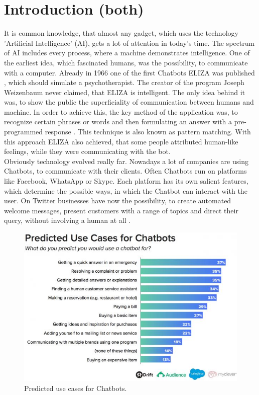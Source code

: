 \documentclass[10pt,final,journal,a4paper,oneside,twocolumn]{IEEEtran}
\begin{document}
\section{Introduction (both)}
It is common knowledge, that almost any gadget, which uses the technology 'Artificial Intelligence' (AI), gets a lot of attention in today's time. The spectrum of AI includes every process, where a machine demonstrates intelligence. One of the earliest idea, which fascinated humans, was the possibility, to communicate with a computer. Already in 1966 one of the first Chatbots ELIZA was published \cite{b1}, which should simulate a psychotherapist. The creator of the program Joseph Weizenbaum never claimed, that ELIZA is intelligent. The only idea behind it was, to show the public the superficiality of communication between humans and machine. In order to achieve this, the key method of the application was, to recognize certain phrases or words and then formulating an answer with a pre-programmed response \cite{b1}. This technique is also known as pattern matching. With this approach ELIZA also achieved, that some people attributed human-like feelings, while they were communicating with the bot.\\
Obviously technology evolved really far. Nowadays a lot of companies are using Chatbots, to communicate with their clients. Often Chatbots run on platforms like Facebook, WhatsApp or Skype. Each platform has its own salient features, which determine the possible ways, in which the Chatbot can interact with the user. On Twitter businesses have now the possibility, to create automated welcome messages, present customers with a range of topics and direct their query, without involving a human at all \cite{b2}.
\begin{figure}[htbp]
	\centerline{\includegraphics[width=1\linewidth]{pictures/Statistic.jpg}}
	\caption{Predicted use cases for Chatbots\cite{b3}.}
	\label{statistic}
\end{figure}
\end{document}
